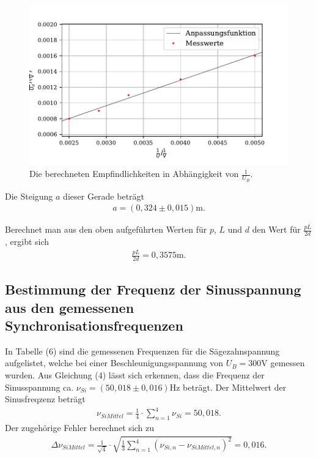 \begin{figure}[H]
  \centering
  \includegraphics{plot8.pdf}
  \caption{Die berechneten Empfindlichkeiten in Abhängigkeit von $\frac{1}{U_B}$.}
  \label{fig:plot}
\end{figure}

\noindent Die Steigung $a$ dieser Gerade beträgt
\begin{align*}
a = (0,324 \pm 0,015)  \si{\meter} .
\end{align*}

\noindent Berechnet man aus den oben aufgeführten Werten für $p$, $L$ und $d$ den Wert für $\frac{pL}{2d}$, ergibt sich
\begin{align*}
\frac{pL}{2d} = 0,3575 \si{\meter}.
\end{align*}




\subsection{Bestimmung der Frequenz der Sinusspannung aus den gemessenen Synchronisationsfrequenzen}

In Tabelle (6) sind die gemessenen Frequenzen für die Sägezahnspannung aufgelistet, welche bei einer Beschleunigungsspannung von $U_B = 300 \si{\volt}$ gemessen wurden.
Aus Gleichung (4) lässt sich erkennen, dass die Frequenz der Sinusspannung ca. $\nu_{Si} = (50,018 \pm 0,016) \si{\hertz}$ beträgt.
Der Mittelwert der Sinusfreqzenz beträgt
\begin{align*}
\nu_{SiMittel} = \frac{1}{4}\cdot \sum_{n=1}^4 \nu_{Si} = 50,018 .
\end{align*}
Der zugehörige Fehler berechnet sich zu
\begin{align*}
\Delta\nu_{SiMittel} = \frac{1}{\sqrt{4}} \cdot \sqrt{\frac{1}{3} \sum_{n=1}^4 (\nu_{Si,n} - \nu_{SiMittel,n})^2} = 0,016 .
\end{align*}

